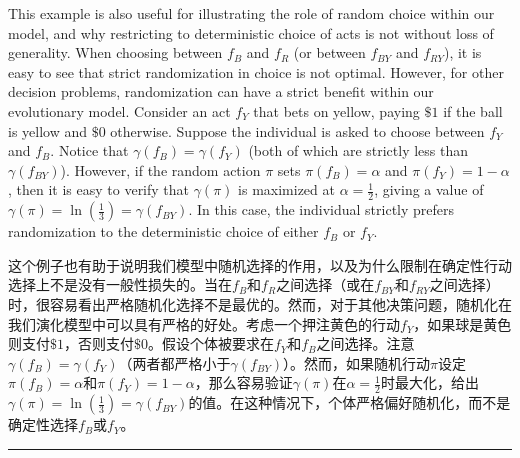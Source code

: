 \documentclass[12pt,a4paper]{article}
\newenvironment{original}
  {\par\noindent\color{black}\smallskip}
  {\par\smallskip}
\newenvironment{translation}
  {\par\noindent\color{blue!70!black}\smallskip}
  {\par\medskip\hrule\medskip}
\begin{document}
\begin{original}
This example is also useful for illustrating the role of random choice within our model, and why restricting to deterministic choice of acts is not without loss of generality. When choosing between $f_B$ and $f_R$ (or between $f_{BY}$ and $f_{RY}$), it is easy to see that strict randomization in choice is not optimal. However, for other decision problems, randomization can have a strict benefit within our evolutionary model. Consider an act $f_Y$ that bets on yellow, paying $\$1$ if the ball is yellow and $\$0$ otherwise. Suppose the individual is asked to choose between $f_Y$ and $f_B$. Notice that $\gamma(f_B) = \gamma(f_Y)$ (both of which are strictly less than $\gamma(f_{BY})$). However, if the random action $\pi$ sets $\pi(f_B) = \alpha$ and $\pi(f_Y) = 1 - \alpha$, then it is easy to verify that $\gamma(\pi)$ is maximized at $\alpha = \frac{1}{2}$, giving a value of $\gamma(\pi) = \ln(\frac{1}{3}) = \gamma(f_{BY})$. In this case, the individual strictly prefers randomization to the deterministic choice of either $f_B$ or $f_Y$.
\end{original}
\begin{translation}
这个例子也有助于说明我们模型中随机选择的作用，以及为什么限制在确定性行动选择上不是没有一般性损失的。当在$f_B$和$f_R$之间选择（或在$f_{BY}$和$f_{RY}$之间选择）时，很容易看出严格随机化选择不是最优的。然而，对于其他决策问题，随机化在我们演化模型中可以具有严格的好处。考虑一个押注黄色的行动$f_Y$，如果球是黄色则支付$\$1$，否则支付$\$0$。假设个体被要求在$f_Y$和$f_B$之间选择。注意$\gamma(f_B) = \gamma(f_Y)$（两者都严格小于$\gamma(f_{BY})$）。然而，如果随机行动$\pi$设定$\pi(f_B) = \alpha$和$\pi(f_Y) = 1 - \alpha$，那么容易验证$\gamma(\pi)$在$\alpha = \frac{1}{2}$时最大化，给出$\gamma(\pi) = \ln(\frac{1}{3}) = \gamma(f_{BY})$的值。在这种情况下，个体严格偏好随机化，而不是确定性选择$f_B$或$f_Y$。
\end{translation}
\end{document}
